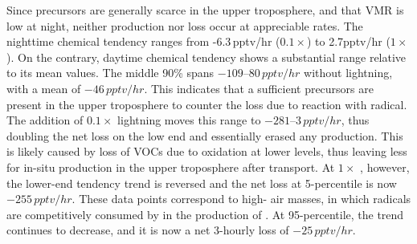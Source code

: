 Since  precursors are generally scarce in the upper troposphere, and that  VMR is low at night,
neither production nor loss occur at appreciable rates. The nighttime  chemical tendency ranges from
-6.3\,\unit{pptv/hr} ($0.1\times$) to 2.7\unit{pptv/hr} ($1\times$). On the contrary, daytime  chemical tendency
shows a substantial range relative to its mean values. The middle 90\% spans $-109$--$80\,\unit{pptv/hr}$ without lightning,
with a mean of $-46\,\unit{pptv/hr}$. This indicates that a sufficient  precursors are present in the upper
troposphere to counter the loss due to reaction with  radical. The addition of $0.1\times$ lightning 
moves this range to $-281$--$3\,\unit{pptv/hr}$, thus doubling the net loss on the low end and essentially erased any
production. This is likely caused by loss of VOCs due to oxidation at lower levels, thus leaving less for in-situ 
production in the upper troposphere after transport. At $1\times$ {\lnox}, however, the lower-end tendency trend is
reversed and the net loss at 5-percentile is now $-255\,\unit{pptv/hr}$. These data points correspond to high-{\lnox} air
masses, in which  radicals are competitively consumed by  in the production of .
At 95-percentile, the trend continues to decrease, and it is now a net 3-hourly loss of $-25\,\unit{pptv/hr}$.


